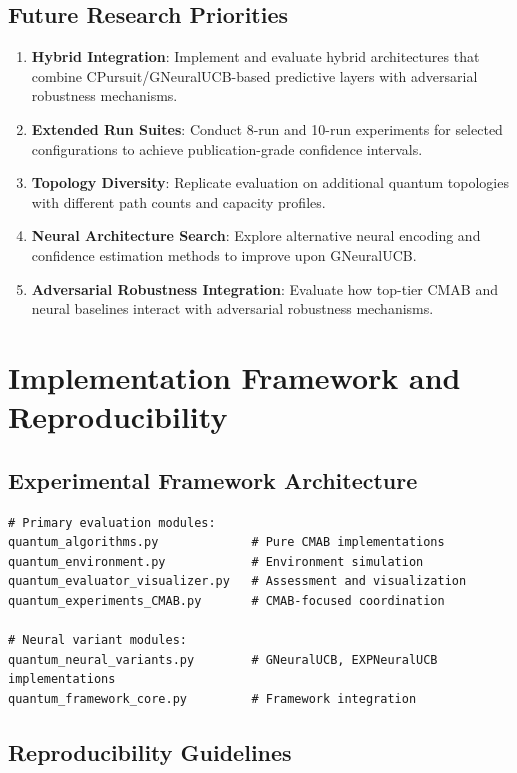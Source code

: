 \documentclass[12pt,a4paper]{article}
\begin{document}
\subsection{Future Research Priorities}

\begin{enumerate}
\item \textbf{Hybrid Integration}: Implement and evaluate hybrid architectures that combine CPursuit/GNeuralUCB-based predictive layers with adversarial robustness mechanisms.
\item \textbf{Extended Run Suites}: Conduct 8-run and 10-run experiments for selected configurations to achieve publication-grade confidence intervals.
\item \textbf{Topology Diversity}: Replicate evaluation on additional quantum topologies with different path counts and capacity profiles.
\item \textbf{Neural Architecture Search}: Explore alternative neural encoding and confidence estimation methods to improve upon GNeuralUCB.
\item \textbf{Adversarial Robustness Integration}: Evaluate how top-tier CMAB and neural baselines interact with adversarial robustness mechanisms.
\end{enumerate}

\newpage
\section{Implementation Framework and Reproducibility}

\subsection{Experimental Framework Architecture}

\begin{lstlisting}[caption=Core Framework Components]
# Primary evaluation modules:
quantum_algorithms.py             # Pure CMAB implementations
quantum_environment.py            # Environment simulation
quantum_evaluator_visualizer.py   # Assessment and visualization
quantum_experiments_CMAB.py       # CMAB-focused coordination

# Neural variant modules:
quantum_neural_variants.py        # GNeuralUCB, EXPNeuralUCB implementations
quantum_framework_core.py         # Framework integration
\end{lstlisting}

\subsection{Reproducibility Guidelines}
\end{document}

